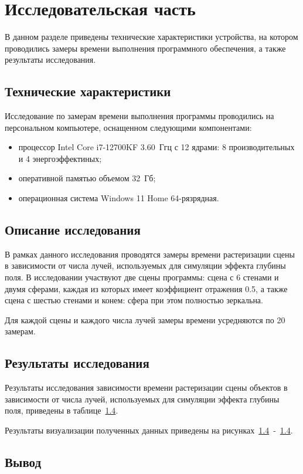 \chapter{Исследовательская часть}

В данном разделе приведены технические характеристики устройства, на котором проводились замеры времени выполнения программного обеспечения, а также результаты исследования.

\section{Технические характеристики}
Исследование по замерам времени выполнения программы проводились на персональном компьютере, оснащенном следующими компонентами:
\begin{itemize}
	\item процессор Intel Core i7-12700KF 3.60~Ггц с 12 ядрами: 8 производительных и 4 энергоэффектиных;
	\item оперативной памятью объемом 32~Гб;
	\item операционная система Windows 11 Home 64-рязрядная.
	\end{itemize}
	
\section{Описание исследования}
В рамках данного исследования проводятся замеры времени растеризации сцены в зависимости от числа лучей, используемых для симуляции эффекта глубины поля. В исследовании участвуют две сцены программы: сцена с 6 стенами и двумя сферами, каждая из которых имеет коэффициент отражения 0.5, а также сцена с шестью стенами и конем: сфера при этом полностью зеркальна.

Для каждой сцены и каждого числа лучей замеры времени усредняются по 20 замерам.

\section{Результаты исследования}
Результаты исследования зависимости времени растеризации сцены объектов в зависимости от числа лучей, используемых для симуляции эффекта глубины поля, приведены в таблице~\ref{}.

Результаты визуализации полученных данных приведены на рисунках~\ref{}~-~\ref{}.






\section{Вывод}

\clearpage
